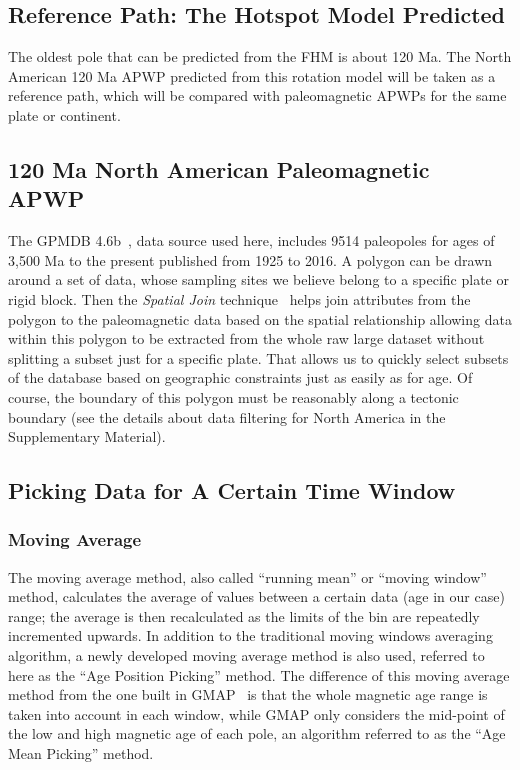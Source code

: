 \subsection{Reference Path: The Hotspot Model Predicted}

The oldest pole that can be predicted from the FHM is about 120 Ma. The North
American 120 Ma APWP predicted from this rotation model will be
taken as a reference path, which will be compared with paleomagnetic APWPs for
the same plate or continent.

\subsection{120 Ma North American Paleomagnetic APWP}

The GPMDB 4.6b~\cite{P05}, data source used here, includes 9514 paleopoles for
ages of 3,500 Ma to the present published from 1925 to 2016. A polygon
can be drawn around a set of data, whose sampling sites we believe belong to a
specific plate or rigid block. Then the {\em Spatial Join\/}
technique~\cite{J07} helps join attributes from the polygon to the paleomagnetic
data based on the spatial relationship allowing data within this polygon to be
extracted from the whole raw large dataset without splitting a subset just for a
specific plate. That allows us to quickly select subsets of the database based
on geographic constraints just as easily as for age. Of course, the boundary of
this polygon must be reasonably along a tectonic boundary (see the details
about data filtering for North America in the Supplementary Material).

\subsection{Picking Data for A Certain Time Window}

\subsubsection{Moving Average}

The moving average method, also called ``running mean'' or ``moving
window''~\cite{T08} method, calculates the average of values between a certain
data (age in our case) range; the average is then recalculated as the limits of
the bin are repeatedly incremented upwards. In addition to the traditional
moving windows averaging algorithm, a newly developed moving average method is
also used, referred to here as the ``Age Position Picking'' method. The
difference of this moving average method from the one built in
GMAP~\cite{T99,T08} is that the whole magnetic age range is taken into account
in each window, while GMAP only considers the mid-point of the low and high
magnetic age of each pole, an algorithm referred to as the ``Age Mean Picking''
method.

